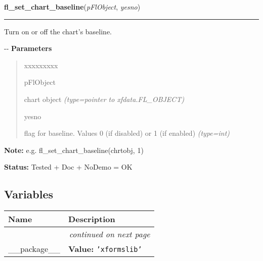 \hspace{.8\funcindent}\begin{boxedminipage}{\funcwidth}

    \raggedright \textbf{fl\_set\_chart\_baseline}(\textit{pFlObject}, \textit{yesno})

    \vspace{-1.5ex}

    \rule{\textwidth}{0.5\fboxrule}
\setlength{\parskip}{2ex}

Turn on or off the chart's baseline.

-{}-
\setlength{\parskip}{1ex}
      \textbf{Parameters}
      \vspace{-1ex}

      \begin{quote}
        \begin{Ventry}{xxxxxxxxx}

          \item[pFlObject]


chart object
            {\it (type=pointer to xfdata.FL\_OBJECT)}

          \item[yesno]


flag for baseline. Values 0 (if disabled) or 1 (if enabled)
            {\it (type=int)}

        \end{Ventry}

      \end{quote}

\textbf{Note:} 
e.g. fl\_set\_chart\_baseline(chrtobj, 1)


\textbf{Status:} 
Tested + Doc + NoDemo = OK


    \end{boxedminipage}



  \subsection{Variables}

    \vspace{-1cm}
\hspace{\varindent}\begin{longtable}{|p{\varnamewidth}|p{\vardescrwidth}|l}
\cline{1-2}
\cline{1-2} \centering \textbf{Name} & \centering \textbf{Description}& \\
\cline{1-2}
\endhead\cline{1-2}\multicolumn{3}{r}{\small\textit{continued on next page}}\\\endfoot\cline{1-2}
\endlastfoot\raggedright \_\-\_\-p\-a\-c\-k\-a\-g\-e\-\_\-\_\- & \raggedright \textbf{Value:} 
{\tt \texttt{'}\texttt{xformslib}\texttt{'}}&\\
\cline{1-2}
\end{longtable}

